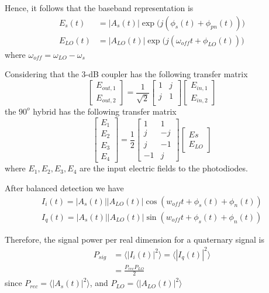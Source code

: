 \documentclass[a4paper]{article}
\begin{document}
Hence, it follows that the baseband representation is 
\begin{align}
E_s(t) &= |A_s(t)|\exp\Big(j(\phi_s(t) + \phi_{pn}(t))\Big) \\
E_{LO}(t) &= |A_{LO}(t)|\exp\Big(j(\omega_{off}t + \phi_{LO}(t))\Big)
\end{align}
where $\omega_{off} =\omega_{LO}-\omega_s$

Considering that the 3-dB coupler has the following transfer matrix
\begin{equation}
\begin{bmatrix}
E_{out, 1} \\
E_{out, 2}
\end{bmatrix} = \frac{1}{\sqrt{2}}\begin{bmatrix}
1 & j \\
j & 1 \\
\end{bmatrix}\begin{bmatrix}
E_{in, 1} \\
E_{in, 2}
\end{bmatrix}
\end{equation}
the $90^o$ hybrid has the following transfer matrix
\begin{equation}
\begin{bmatrix}
E_1\\
E_2\\
E_3\\
E_4
\end{bmatrix} = \frac{1}{2}\begin{bmatrix}
1 & 1 \\
j & -j \\
j & -1\\
-1 & j
\end{bmatrix}\begin{bmatrix}
E{s} \\
E_{LO}
\end{bmatrix}
\end{equation}
where $E_1, E_2, E_3, E_4$ are the input electric fields to the photodiodes.

After balanced detection we have
\begin{align}
I_i(t) = |A_s(t)||A_{LO}(t)|\cos(w_{off}t + \phi_s(t) + \phi_n(t)) \\
I_q(t) = |A_s(t)||A_{LO}(t)|\sin(w_{off}t + \phi_s(t) + \phi_n(t))
\end{align}

Therefore, the signal power per real dimension for a quaternary signal is
\begin{align} \nonumber
P_{sig} &= \langle|I_i(t)|^2\rangle = \langle|I_q(t)|^2\rangle \\
&= \frac{P_{rec}P_{LO}}{2}
\end{align}
since $P_{rec} = \langle|A_s(t)|^2\rangle$, and $P_{LO} = \langle|A_{LO}(t)|^2\rangle$
\end{document}
